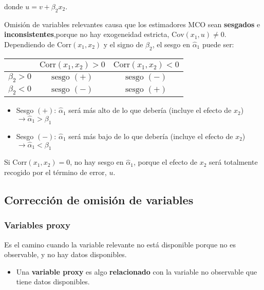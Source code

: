\documentclass[10pt, a4paper, landscape]{extarticle}
\newcommand{\Cov}{\mathrm{Cov}}
\newcommand{\Corr}{\mathrm{Corr}}
\begin{document}
\begin{multicols}{3}
\quad donde $u = v + \beta_2 x_2$.

Omisión de variables relevantes causa que los estimadores MCO sean \textbf{sesgados} e \textbf{inconsistentes},porque no hay exogeneidad estricta, $\Cov(x_1, u) \neq 0$. Dependiendo de $\Corr(x_1, x_2)$ y el signo de $\beta_2$, el sesgo en $\hat{\alpha}_1$ puede ser:

\begin{center}
	\begin{tabular}{ c | c c }
		\multicolumn{1}{c|}{} & $\Corr(x_1, x_2) > 0$ & $\Corr(x_1, x_2) < 0$ \\ \hline
		$\beta_2 > 0$         & $\text{sesgo } (+)$   & $\text{sesgo } (-)$   \\
		$\beta_2 < 0$         & $\text{sesgo } (-)$   & $\text{sesgo } (+)$
	\end{tabular}
\end{center}

\begin{itemize}[leftmargin=*]
	\item Sesgo $(+)$: $\hat{\alpha}_1$ será más alto de lo que debería (incluye el efecto de $x_2$) $\rightarrow \hat{\alpha}_1 > \beta_1$
	\item Sesgo $(-)$: $\hat{\alpha}_1$ será más bajo de lo que debería (incluye el efecto de $x_2$) $\rightarrow \hat{\alpha}_1 < \beta_1$
\end{itemize}

Si $\Corr(x_1, x_2) = 0$, no hay sesgo en $\hat{\alpha}_1$, porque el efecto de $x_2$ será totalmente recogido por el término de error, $u$.

\columnbreak

\subsection*{Corrección de omisión de variables}

\subsubsection*{Variables proxy}

Es el camino cuando la variable relevante no está disponible porque no es observable, y no hay datos disponibles.

\begin{itemize}[leftmargin=*]
	\item Una \textbf{variable proxy} es algo \textbf{relacionado} con la variable no observable que tiene datos disponibles.
\end{itemize}


\end{multicols}
\end{document}
